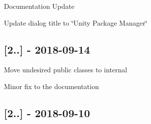 \begin{DoxyItemize}
\item Documentation Update
\item Update dialog title to \char`\"{}\+Unity Package Manager\char`\"{}
\end{DoxyItemize}

\subsection*{\mbox{[}2..\mbox{]} -\/ 2018-\/09-\/14}


\begin{DoxyItemize}
\item Move undesired public classes to internal
\item Minor fix to the documentation
\end{DoxyItemize}

\subsection*{\mbox{[}2..\mbox{]} -\/ 2018-\/09-\/10}


